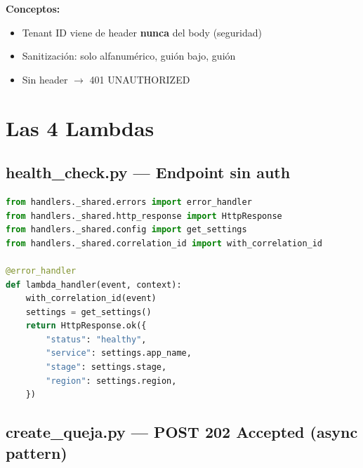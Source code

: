 \documentclass[11pt,a4paper,oneside]{article}
\newcommand{\ok}{\textcolor{okgreen}{\textbf{\checkmark}}}
\newcommand{\err}{\textcolor{errred}{\textbf{\ding{55}}}}
\begin{document}
\textbf{Conceptos:}
\begin{itemize}
  \item \ok Tenant ID viene de header \textbf{nunca} del body (seguridad)
  \item \ok Sanitizaci\'on: solo alfanum\'erico, gui\'on bajo, gui\'on
  \item \err Sin header $\rightarrow$ 401 UNAUTHORIZED
\end{itemize}

\section{Las 4 Lambdas}

\subsection{health\_check.py --- Endpoint sin auth}

\begin{lstlisting}[language=Python,caption={handlers/health\_check.py}]
from handlers._shared.errors import error_handler
from handlers._shared.http_response import HttpResponse
from handlers._shared.config import get_settings
from handlers._shared.correlation_id import with_correlation_id

@error_handler
def lambda_handler(event, context):
    with_correlation_id(event)
    settings = get_settings()
    return HttpResponse.ok({
        "status": "healthy",
        "service": settings.app_name,
        "stage": settings.stage,
        "region": settings.region,
    })
\end{lstlisting}

\subsection{create\_queja.py --- POST 202 Accepted (async pattern)}
\end{document}
